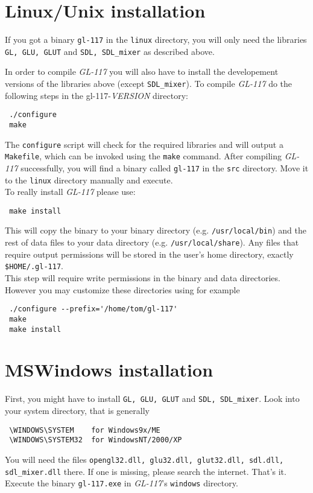 \section{Linux/Unix installation}
\label{sec:linux_installation}

If you got a binary \texttt{gl-117} in the \texttt{linux} directory, you will only
need the libraries \texttt{GL, GLU, GLUT} and \texttt{SDL, SDL\_mixer} as
described above.

In order to compile \emph{GL-117} you will also have to install the developement
versions of the libraries above (except \texttt{SDL\_mixer}).
To compile \emph{GL-117} do the following steps in the gl-117-\textit{VERSION}
directory:
\begin{verbatim}
 ./configure
 make
\end{verbatim}

The \texttt{configure} script will check for the required libraries and will output
a \texttt{Makefile}, which can be invoked using the \texttt{make} command.
After compiling \emph{GL-117} successfully, you will find a binary called \texttt{gl-117}
in the \texttt{src} directory. Move it to the \texttt{linux} directory manually and
execute.\\
To really install \emph{GL-117} please use:
\begin{verbatim}
 make install
\end{verbatim}
This will copy the binary to your binary directory (e.g. \texttt{/usr/local/bin})
and the rest of data files to your data directory (e.g. \texttt{/usr/local/share}).
Any files that require output permissions will be stored in the user's home directory,
exactly \texttt{\$HOME/.gl-117}.\\
This step will require write permissions in the binary and data directories.
However you may customize these directories using for example
\begin{verbatim}
 ./configure --prefix='/home/tom/gl-117'
 make
 make install
\end{verbatim}


\section{MSWindows installation}
\label{sec:windows_installation}

First, you might have to install \texttt{GL, GLU, GLUT} and \texttt{SDL, SDL\_mixer}.
Look into your system directory, that is generally
\begin{verbatim}
 \WINDOWS\SYSTEM    for Windows9x/ME
 \WINDOWS\SYSTEM32  for WindowsNT/2000/XP
\end{verbatim}
You will need the files \texttt{opengl32.dll, glu32.dll, glut32.dll, sdl.dll, sdl\_mixer.dll}
there.
If one is missing, please search the internet.
That's it. Execute the binary \texttt{gl-117.exe} in \emph{GL-117}'s \texttt{windows}
directory.\\

